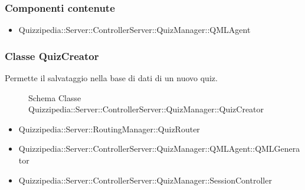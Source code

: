 \subsubsection{Componenti contenute}
\begin{itemize}
\item Quizzipedia::Server::ControllerServer::QuizManager::QMLAgent
\end{itemize}
\subsubsection{Classe QuizCreator}
Permette il salvataggio nella base di dati di un nuovo quiz.
\begin{figure}[H]
\centering
\noindent{}
\caption[Schema Classe QuizCreator]{Schema Classe Quizzipedia::Server::ControllerServer::QuizManager::QuizCreator}
\end{figure}
\begin{itemize}
\item Quizzipedia::Server::RoutingManager::QuizRouter
\end{itemize}
\begin{itemize}
\item Quizzipedia::Server::ControllerServer::QuizManager::QMLAgent::QMLGenerator
\item Quizzipedia::Server::ControllerServer::QuizManager::SessionController
\end{itemize}

